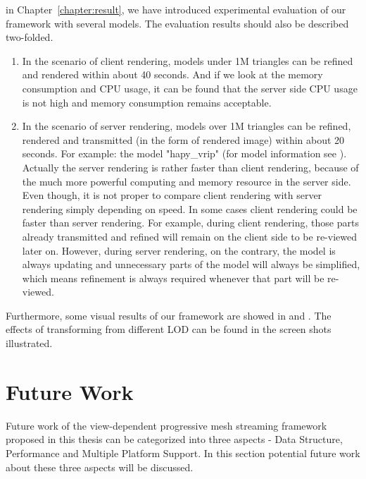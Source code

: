 in Chapter~\ref{chapter:result}, we have introduced experimental evaluation of our framework with several models. The evaluation results should also be described two-folded. 
\begin{enumerate}
\item
In the scenario of client rendering, models under 1M triangles can be refined and rendered within about 40 seconds. And if we look at the memory consumption and CPU usage, it can be found that the server side CPU usage is not high and memory consumption remains acceptable. 

\item
In the scenario of server rendering, models over 1M triangles can be refined, rendered and transmitted (in the form of rendered image) within about 20 seconds.  For example: the model "hapy\_vrip" (for model information see ). Actually the server rendering is rather faster than client rendering, because of the much more powerful computing and memory resource in the server side. Even though, it is not proper to compare client rendering with server rendering simply depending on speed. In some cases client rendering could be faster than server rendering. For example, during client rendering, those parts already transmitted and refined will remain on the client side to be re-viewed later on. However, during server rendering, on the contrary, the model is always updating and unnecessary parts of the model will always be simplified, which means refinement is always required whenever that part will be re-viewed. 

\end{enumerate}

Furthermore, some visual results of our framework are showed in  and . The effects of transforming from different LOD can be found in the screen shots illustrated. 


\section{Future Work}
\label{section:future work}
Future work of the view-dependent progressive mesh streaming framework proposed in this thesis can be categorized into three aspects -  Data Structure, Performance and Multiple Platform Support. In this section potential future work about these three aspects will be discussed. 


